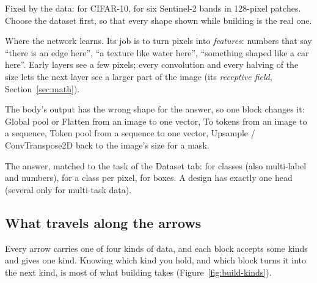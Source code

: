 \begin{description}[nosep]
  \item[Input.] Fixed by the data:  for CIFAR-10,  for six Sentinel-2 bands in 128-pixel patches.
        Choose the dataset first, so that every shape shown while building is the real one.
  \item[Body.] Where the network learns. Its job is to turn pixels into \emph{features}: numbers that say ``there is an edge here'',
        ``a texture like water here'', ``something shaped like a car here''. Early layers see a few pixels; every convolution and every
        halving of the size lets the next layer see a larger part of the image (its \emph{receptive field}, Section~\ref{sec:math}).
  \item[Bridge.] The body's output has the wrong shape for the answer, so one block changes it: Global pool or Flatten from an image to
        one vector, To tokens from an image to a sequence, Token pool from a sequence to one vector, Upsample / ConvTranspose2D back to the
        image's size for a mask.
  \item[Head.] The answer, matched to the task of the Dataset tab:  for classes (also multi-label and numbers),
         for a class per pixel,  for boxes. A design has exactly one head (several only for
        multi-task data).
\end{description}

\subsection{What travels along the arrows}
\label{sec:build-kinds}
Every arrow carries one of four kinds of data, and each block accepts some kinds and gives one kind. Knowing which kind you hold, and
which block turns it into the next kind, is most of what building takes (Figure~\ref{fig:build-kinds}).

